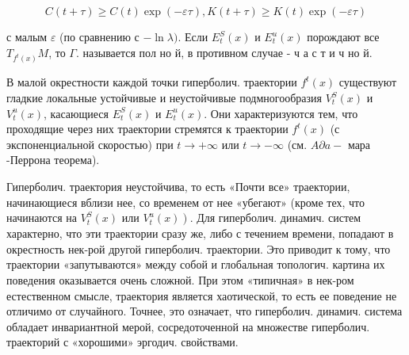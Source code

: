 \documentclass[10pt]{article}
\begin{document}
\[

C(t+\tau) \geqslant C(t) \exp (-\varepsilon \tau), K(t+\tau) \geqslant K(t) \exp (-\varepsilon \tau)

\]



с малым $\varepsilon$ (по сравнению с $-\ln \lambda)$. Если $E_{t}^{S}(x)$ и $E_{t}^{u}(x)$ порождают все $T_{f^{t}(x)} M$, то $\Gamma$. называется пол но й, в противном случае - ч а с т и ч но й.



В малой окрестности каждой точки гиперболич. траектории $f^{t}(x)$ существуют гладкие локальные устойчивые и неустойчивые подмногообразия $V_{t}^{S}(x)$ и $V_{t}^{u}(x)$, касающиеся $E_{t}^{S}(x)$ и $E_{t}^{u}(x)$. Они характеризуются тем, что проходящие через них траектории стремятся к траектории $f^{t}(x)$ (с экспоненциальной скоростью) при $t \rightarrow+\infty$ или $t \rightarrow-\infty$ (см. $A \partial a-$ мара -Перрона теорема).



Гиперболич. траектория неустойчива, то есть «Почти все» траектории, начинающиеся вблизи нее, со временем от нее «убегают» (кроме тех, что начинаются на $V_{t}^{S}(x)$ или $\left.V_{t}^{u}(x)\right)$. Для гиперболич. динамич. систем характерно, что эти траектории сразу же, либо с течением времени, попадают в окрестность нек-рой другой гиперболич. траектории. Это приводит к тому, что траектории «запутываются» между собой и глобальная топологич. картина их поведения оказывается очень сложной. При этом «типичная» в нек-ром естественном смысле, траектория является хаотической, то есть ее поведение не отличимо от случайного. Точнее, это означает, что гиперболич. динамич. система обладает инвариантной мерой, сосредоточенной на множестве гиперболич. траекторий с «хорошими» эргодич. свойствами.
\end{document}
